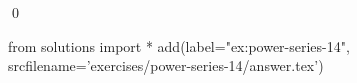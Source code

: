 
    \begin{ex}
  \label{ex:power-series-14}
  
  \qed
\end{ex}
\begin{python0}
from solutions import *
add(label="ex:power-series-14",
    srcfilename='exercises/power-series-14/answer.tex') 
\end{python0}                              
